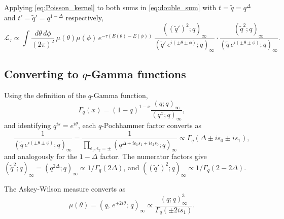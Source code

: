 \documentclass[12pt]{article}
\renewcommand{\qq}[1]{(#1;\,q)_\infty}
\begin{document}
Applying \eqref{eq:Poisson_kernel} to both sums in \eqref{eq:double_sum} with
$t=\tilde{q}=q^\Delta$ and $t'=\tilde{q}'=q^{1-\Delta}$ respectively,
\begin{equation}
    \mathcal{L}_\tau
    \propto
    \int\frac{d\theta\,d\phi}{(2\pi)^2}\,\mu(\theta)\mu(\phi)\,
    e^{-\tau(E(\theta)-E(\phi))}\,
    \frac{((\tilde{q}')^2;q)_\infty}{(\tilde{q}'\,e^{i(\pm\theta\pm\phi)};q)_\infty}
    \cdot
    \frac{(\tilde{q}^2;q)_\infty}{(\tilde{q}\,e^{i(\pm\theta\pm\phi)};q)_\infty}.
    \label{eq:after_identity}
\end{equation}

\subsection{Converting to $q$-Gamma functions}

Using the definition of the $q$-Gamma function,
\begin{equation}
    \Gamma_q(x) = (1-q)^{1-x}\frac{(q;q)_\infty}{(q^x;q)_\infty},
\end{equation}
and identifying $q^{is} = e^{i\theta}$, each $q$-Pochhammer factor converts as
\begin{equation}
    \frac{1}{(\tilde{q}\,e^{i(\pm\theta\pm\phi)};q)_\infty}
    = \frac{1}{\prod_{\epsilon_1,\epsilon_2=\pm}(q^{\Delta+i\epsilon_1 s_1+i\epsilon_2 s_0};q)_\infty}
    \propto \Gamma_q(\Delta \pm is_0 \pm is_1),
    \label{eq:pochhammer_to_gamma}
\end{equation}
and analogously for the $1-\Delta$ factor. The numerator factors give
$(\tilde{q}^2;q)_\infty = (q^{2\Delta};q)_\infty \propto 1/\Gamma_q(2\Delta)$, and
$((\tilde{q}')^2;q)_\infty \propto 1/\Gamma_q(2-2\Delta)$.

The Askey-Wilson measure converts as
\begin{equation}
    \mu(\theta) = \qq{q,\,e^{\pm 2i\theta}} \propto \frac{(q;q)_\infty^3}{\Gamma_q(\pm 2is_1)}.
\end{equation}
\end{document}
